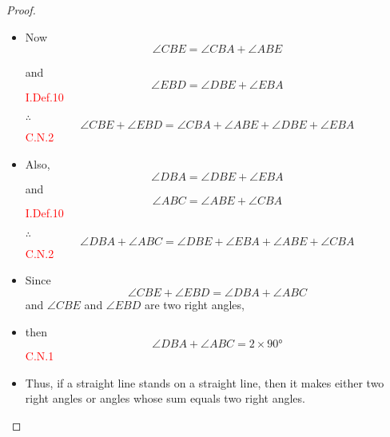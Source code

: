\begin{proof}
\begin{itemize}
\clearpage
    
    \item Now 
    \[\angle{CBE} = \angle{CBA} + \angle{ABE}\] 
    
    and 
    \[\angle{EBD} = \angle{DBE} + \angle{EBA}\] \hfill\textcolor{red}{I.Def.10}
    
    \item[$\therefore$] \[\angle{CBE} + \angle{EBD} = \angle{CBA} + \angle{ABE} + \angle{DBE} + \angle{EBA}\]\hfill\textcolor{red}{C.N.2}
    
    \item Also, \[\angle{DBA} = \angle{DBE} + \angle{EBA}\] 
    and 
    \[\angle{ABC} = \angle{ABE} + \angle{CBA}\]\hfill\textcolor{red}{I.Def.10}
    
    \item[$\therefore$]\[\angle{DBA} + \angle{ABC} = \angle{DBE} + \angle{EBA} + \angle{ABE} + \angle{CBA}\] \hfill\textcolor{red}{C.N.2}
    
    \item Since 
    \[\angle{CBE} + \angle{EBD} = \angle{DBA} + \angle{ABC}\] 
    and 
    $\angle{CBE}$ and $\angle{EBD}$ are two right angles, 
    
    \item then 
    \[\angle{DBA} + \angle{ABC} = 2\times\ang{90}\] \hfill\textcolor{red}{C.N.1}
  
\clearpage
    
    \item Thus, if a straight line stands on a straight line, then it makes either two right angles or angles whose sum equals two right angles. 
\end{itemize}

\end{proof}

\clearpage
